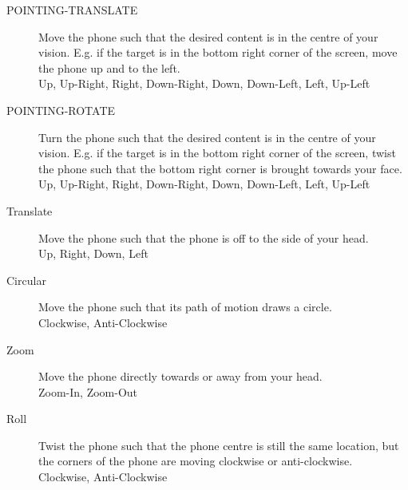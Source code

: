 \begin{description}
    \item[POINTING-TRANSLATE]\nl
    Move the phone such that the desired content is in the centre of your vision. E.g. if the target is in the bottom right corner of the screen, move the phone up and to the left.\\
     Up, Up-Right, Right, Down-Right, Down, Down-Left, Left, Up-Left
    \item[POINTING-ROTATE]\nl
    Turn the phone such that the desired content is in the centre of your vision. E.g. if the target is in the bottom right corner of the screen, twist the phone such that the bottom right corner is brought towards your face.\\
     Up, Up-Right, Right, Down-Right, Down, Down-Left, Left, Up-Left
    \item[Translate]\nl
    Move the phone such that the phone is off to the side of your head.\\
     Up, Right, Down, Left
    \item[Circular]\nl
    Move the phone such that its path of motion draws a circle.\\
     Clockwise, Anti-Clockwise
    \item[Zoom]\nl
    Move the phone directly towards or away from your head.\\
     Zoom-In, Zoom-Out
    \item[Roll]\nl
    Twist the phone such that the phone centre is still the same location, but the corners of the phone are moving clockwise or anti-clockwise.\\
     Clockwise, Anti-Clockwise
\end{description}



